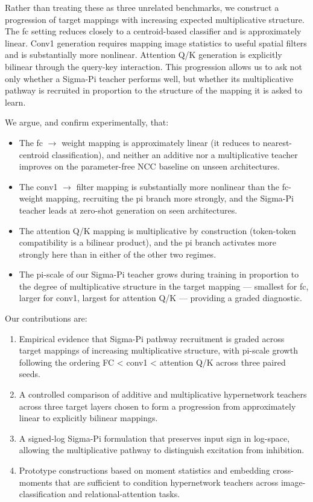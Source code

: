 \documentclass{article}
\providecommand{\tightlist}{%
  \setlength{\itemsep}{0pt}\setlength{\parskip}{0pt}}
\begin{document}
Rather than treating these as three unrelated benchmarks, we construct a progression of target mappings with increasing expected multiplicative structure. The fc setting reduces closely to a centroid-based classifier and is approximately linear. Conv1 generation requires mapping image statistics to useful spatial filters and is substantially more nonlinear. Attention Q/K generation is explicitly bilinear through the query-key interaction. This progression allows us to ask not only whether a Sigma-Pi teacher performs well, but whether its multiplicative pathway is recruited in proportion to the structure of the mapping it is asked to learn.

We argue, and confirm experimentally, that:

\begin{itemize}
\tightlist
\item
  The fc $\to$ weight mapping is approximately linear (it reduces to nearest-centroid classification), and neither an additive nor a multiplicative teacher improves on the parameter-free NCC baseline on unseen architectures.
\item
  The conv1 $\to$ filter mapping is substantially more nonlinear than the fc-weight mapping, recruiting the pi branch more strongly, and the Sigma-Pi teacher leads at zero-shot generation on seen architectures.
\item
  The attention Q/K mapping is multiplicative by construction (token-token compatibility is a bilinear product), and the pi branch activates more strongly here than in either of the other two regimes.
\item
  The pi-scale of our Sigma-Pi teacher grows during training in proportion to the degree of multiplicative structure in the target mapping --- smallest for fc, larger for conv1, largest for attention Q/K --- providing a graded diagnostic.
\end{itemize}

Our contributions are:

\begin{enumerate}
\def\labelenumi{\arabic{enumi}.}
\tightlist
\item
  Empirical evidence that Sigma-Pi pathway recruitment is graded across target mappings of increasing multiplicative structure, with pi-scale growth following the ordering FC \textless{} conv1 \textless{} attention Q/K across three paired seeds.
\item
  A controlled comparison of additive and multiplicative hypernetwork teachers across three target layers chosen to form a progression from approximately linear to explicitly bilinear mappings.
\item
  A signed-log Sigma-Pi formulation that preserves input sign in log-space, allowing the multiplicative pathway to distinguish excitation from inhibition.
\item
  Prototype constructions based on moment statistics and embedding cross-moments that are sufficient to condition hypernetwork teachers across image-classification and relational-attention tasks.
\end{enumerate}
\end{document}
